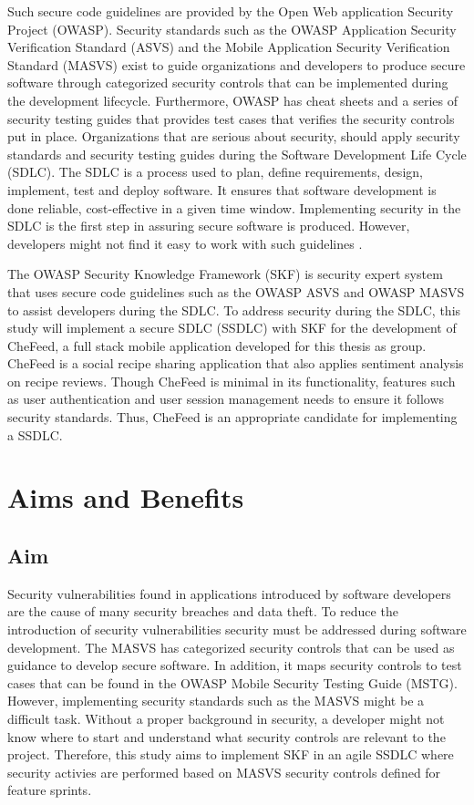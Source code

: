 Such secure code guidelines are provided by the Open Web application Security Project (OWASP). Security standards such as the OWASP Application Security Verification Standard (ASVS) and the Mobile Application Security Verification Standard (MASVS) exist to guide organizations and developers to produce secure software through categorized security controls that can be implemented during the development lifecycle. Furthermore, OWASP has cheat sheets and a series of security testing guides that provides test cases that verifies the security controls put in place. Organizations that are serious about security, should apply security standards and security testing guides during the Software Development Life Cycle (SDLC). The SDLC is a process used to plan, define requirements, design, implement, test and deploy software. It ensures that software development is done reliable, cost-effective in a given time window. Implementing security in the SDLC is the first step in assuring secure software is produced. However, developers might not find it easy to work with such guidelines \cite{Acar_2017}.

The OWASP Security Knowledge Framework (SKF) is security expert system that uses secure code guidelines such as the OWASP ASVS and OWASP MASVS to assist developers during the SDLC. To address security during the SDLC, this study will implement a secure SDLC (SSDLC) with SKF for the development of CheFeed, a full stack mobile application developed for this thesis as group. CheFeed is a social recipe sharing application that also applies sentiment analysis on recipe reviews. Though CheFeed is minimal in its functionality, features such as user authentication and user session management needs to ensure it follows security standards. Thus, CheFeed is an appropriate candidate for implementing a SSDLC. 

\section{Aims and Benefits}

\subsection{Aim}
Security vulnerabilities found in applications introduced by software developers are the cause of many security breaches and data theft. To reduce the introduction of security vulnerabilities security must be addressed during software development. The MASVS has categorized security controls that can be used as guidance to develop secure software. In addition, it maps security controls to test cases that can be found in the OWASP Mobile Security Testing Guide (MSTG). However, implementing security standards such as the MASVS might be a difficult task. Without a proper background in security, a developer might not know where to start and understand what security controls are relevant to the project. Therefore, this study aims to implement SKF in an agile SSDLC where security activies are performed based on MASVS security controls defined for feature sprints.   

